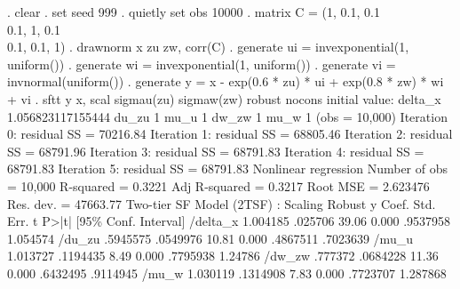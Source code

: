 . clear
{\smallskip}
. set seed 999
{\smallskip}
. quietly set obs 10000
{\smallskip}
. matrix C = (1, 0.1, 0.1 \\ 0.1, 1, 0.1 \\ 0.1, 0.1, 1)
{\smallskip}
. drawnorm x zu zw, corr(C)
{\smallskip}
. generate ui = invexponential(1, uniform())
{\smallskip}
. generate wi = invexponential(1, uniform())
{\smallskip}
. generate vi = invnormal(uniform())
{\smallskip}
. generate y = x - exp(0.6 * zu) * ui + exp(0.8 * zw) * wi + vi
{\smallskip}
. sftt y x, scal sigmau(zu) sigmaw(zw) robust nocons
initial value: delta_x 1.056823117155444 du_zu 1 mu_u 1 dw_zw 1 mu_w 1
(obs = 10,000)
{\smallskip}
Iteration 0:  residual SS =  70216.84
Iteration 1:  residual SS =  68805.46
Iteration 2:  residual SS =  68791.96
Iteration 3:  residual SS =  68791.83
Iteration 4:  residual SS =  68791.83
Iteration 5:  residual SS =  68791.83
{\smallskip}
{\smallskip}
Nonlinear regression                                Number of obs =     10,000
                                                    R-squared     =     0.3221
                                                    Adj R-squared =     0.3217
                                                    Root MSE      =   2.623476
                                                    Res. dev.     =   47663.77
{\smallskip}
Two-tier SF Model (2TSF) : Scaling
             {\VBAR}               Robust
           y {\VBAR}      Coef.   Std. Err.      t    P>|t|     [95\% Conf. Interval]
    /delta_x {\VBAR}   1.004185    .025706    39.06   0.000     .9537958    1.054574
      /du_zu {\VBAR}   .5945575   .0549976    10.81   0.000     .4867511    .7023639
       /mu_u {\VBAR}   1.013727   .1194435     8.49   0.000     .7795938     1.24786
      /dw_zw {\VBAR}    .777372   .0684228    11.36   0.000     .6432495    .9114945
       /mu_w {\VBAR}   1.030119   .1314908     7.83   0.000     .7723707    1.287868
